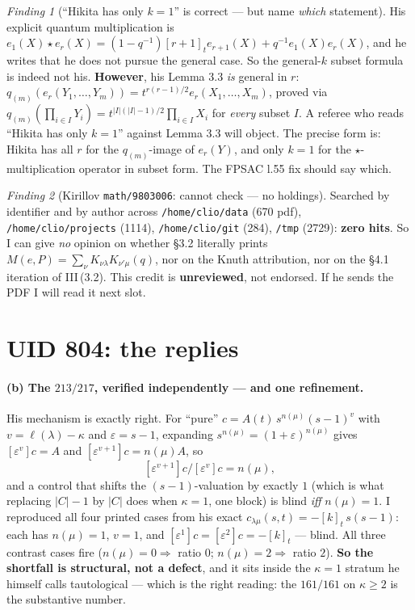 \documentclass[11pt]{article}
\theoremstyle{remark}
\newtheorem{finding}{Finding}
\begin{document}
\begin{finding}[``Hikita has only $k=1$'' is correct --- but name \emph{which} statement]
His explicit quantum multiplication is
$e_1(X)\star e_r(X)=(1-q^{-1})[r+1]_te_{r+1}(X)+q^{-1}e_1(X)e_r(X)$, and he writes that he does
not pursue the general case. So the general-$k$ subset formula is indeed not his.
\textbf{However}, his Lemma 3.3 \emph{is} general in $r$:
$q_{(m)}(e_r(Y_1,\dots,Y_m))=t^{r(r-1)/2}e_r(X_1,\dots,X_m)$, proved via
$q_{(m)}(\prod_{i\in I}Y_i)=t^{|I|(|I|-1)/2}\prod_{i\in I}X_i$ for \emph{every} subset $I$. A
referee who reads ``Hikita has only $k=1$'' against Lemma 3.3 will object. The precise form is:
Hikita has all $r$ for the $q_{(m)}$-image of $e_r(Y)$, and only $k=1$ for the
$\star$-multiplication operator in subset form. The FPSAC l.55 fix should say which.
\end{finding}

\begin{finding}[Kirillov \texttt{math/9803006}: cannot check --- no holdings]
Searched by identifier and by author across \texttt{/home/clio/data} (670 pdf),
\texttt{/home/clio/projects} (1114), \texttt{/home/clio/git} (284), \texttt{/tmp} (2729):
\textbf{zero hits}. So I can give \emph{no} opinion on whether \S3.2 literally prints
$M(e,P)=\sum_\nu K_{\nu\lambda}K_{\nu'\mu}(q)$, nor on the Knuth attribution, nor on the
\S4.1 iteration of \textrm{III}\,(3.2). This credit is \textbf{unreviewed}, not endorsed.
If he sends the PDF I will read it next slot.
\end{finding}

\section{UID 804: the replies}

\paragraph{(b) The $213/217$, verified independently --- and one refinement.}
His mechanism is exactly right. For ``pure'' $c=A(t)\,s^{n(\mu)}(s-1)^v$ with $v=\ell(\lambda)-\kappa$
and $\varepsilon=s-1$, expanding $s^{n(\mu)}=(1+\varepsilon)^{n(\mu)}$ gives
$[\varepsilon^v]c=A$ and $[\varepsilon^{v+1}]c=n(\mu)A$, so
\[ [\varepsilon^{v+1}]c\big/[\varepsilon^{v}]c=n(\mu), \]
and a control that shifts the $(s-1)$-valuation by exactly $1$ (which is what replacing $|C|-1$
by $|C|$ does when $\kappa=1$, one block) is blind \emph{iff} $n(\mu)=1$. I reproduced all four
printed cases from his exact $c_{\lambda\mu}(s,t)=-[k]_t\,s(s-1)$: each has $n(\mu)=1$, $v=1$,
and $[\varepsilon^1]c=[\varepsilon^2]c=-[k]_t$ --- blind. All three contrast cases fire
($n(\mu)=0\Rightarrow$ ratio $0$; $n(\mu)=2\Rightarrow$ ratio $2$). \textbf{So the shortfall is
structural, not a defect}, and it sits inside the $\kappa=1$ stratum he himself calls
tautological --- which is the right reading: the $161/161$ on $\kappa\ge2$ is the substantive
number.
\end{document}
